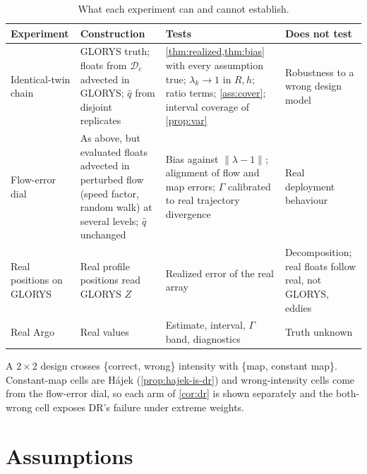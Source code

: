 \begin{table}[ht]
\centering\small
\begin{tabular}{@{}p{2.9cm}p{4.3cm}p{4.3cm}p{3.4cm}@{}}
\toprule
Experiment & Construction & Tests & Does not test\\
\midrule
Identical-twin chain & GLORYS truth; floats from $\mathcal D_c$ advected in GLORYS; $\hat q$ from disjoint
replicates & \cref{thm:realized,thm:bias} with every assumption true; $\lambda_k\to1$ in $R,h$; ratio
terms; \cref{ass:cover}; interval coverage of \cref{prop:var} & Robustness to a wrong design model\\
Flow-error dial & As above, but evaluated floats advected in perturbed flow (speed factor, random walk) at
several levels; $\hat q$ unchanged & Bias against $\|\lambda-1\|$; alignment of flow and map errors;
$\Gamma$ calibrated to real trajectory divergence & Real deployment behaviour\\
Real positions on GLORYS & Real profile positions read GLORYS $Z$ & Realized error of the real array &
Decomposition; real floats follow real, not GLORYS, eddies\\
Real Argo & Real values & Estimate, interval, $\Gamma$ band, diagnostics & Truth unknown\\
\bottomrule
\end{tabular}
\caption{What each experiment can and cannot establish.}
\end{table}

A $2\times2$ design \citep[in the spirit of][]{kang2007} crosses \{correct, wrong\} intensity with
\{map, constant map\}. Constant-map cells are Hájek (\cref{prop:hajek-is-dr}) and wrong-intensity cells
come from the flow-error dial, so each arm of \cref{cor:dr} is shown separately and the both-wrong cell
exposes DR's failure under extreme weights.

\section{Assumptions}\label{sec:assumptions}

